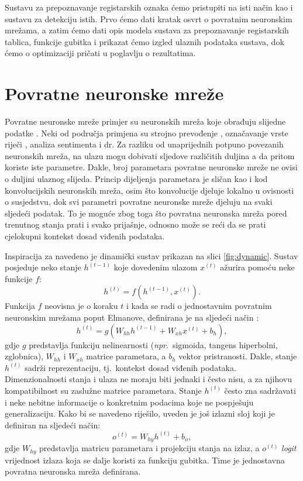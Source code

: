 \documentclass[times, utf8, diplomski]{fer}
\begin{document}
Sustavu za prepoznavanje registarskih oznaka ćemo pristupiti na isti način kao i sustavu za detekciju istih. Prvo ćemo dati kratak osvrt o povratnim neuronskim mrežama, a zatim ćemo dati opis modela sustava za prepoznavanje registarskih tablica, funkcije gubitka i prikazat ćemo izgled ulaznih podataka sustava, dok ćemo o optimizaciji pričati u poglavlju o rezultatima.

\section{Povratne neuronske mreže}
Povratne neuronske mreže primjer su neuronskih mreža koje obrađuju slijedne podatke . Neki od područja primjena su strojno prevođenje , označavanje vrste riječi , analiza sentimenta  i dr. Za razliku od unaprijednih potpuno povezanih neuronskih mreža, na ulazu mogu dobivati sljedove različitih duljina a da pritom koriste iste parametre. Dakle, broj parametara povratne neuronske mreže ne ovisi o duljini ulaznog slijeda. Princip dijeljenja parametara je sličan kao i kod konvolucijskih neuronskih mreža, osim što konvolucije djeluje lokalno u ovisnosti o susjedstvu, dok svi parametri povratne neuronske mreže djeluju na svaki sljedeći podatak. To je moguće zbog toga što povratna neuronska mreža pored trenutnog stanja prati i svako prijašnje, odnosno može se reći da se prati cjelokupni kontekst dosad viđenih podataka.

Inspiracija za navedeno je dinamički sustav prikazan na slici \ref{fig:dynamic}. Sustav posjeduje neko stanje $h^{(t-1)}$ koje dovedenim ulazom $x^{(t)}$ ažurira pomoću neke funkcije $f$:
\begin{equation}
    h^{(t)} = f(h^{(t-1)},x^{(t)}).
\end{equation}
Funkcija $f$ neovisna je o koraku $t$ i kada se radi o jednostavnim povratnim neuronskim mrežama poput Elmanove, definirana je na sljedeći način \citep{duboko}:
\begin{equation}
    h^{(t)} = g(W_{hh}h^{(t-1)} + W_{xh}x^{(t)} + b_h),
    \label{eq:hidden_state}
\end{equation}
gdje $g$ predstavlja funkciju nelinearnosti (\textit{npr}.\ sigmoida, tangens hiperbolni, zglobnica), $W_{hh}$ i $W_{xh}$ matrice parametara, a $b_h$ vektor pristranosti. Dakle, stanje $h^{(t)}$ sadrži reprezentaciju, tj.\ kontekst dosad viđenih podataka. Dimenzionalnosti stanja i ulaza ne moraju biti jednaki i često nisu, a za njihovu kompatibilnost su zaslužne matrice parametara. Stanje $h^{(t)}$ često zna sadržavati i neke nebitne informacije o konkretnim podacima koje ne pospješuju generalizaciju. Kako bi se navedeno riješilo, uveden je još izlazni sloj koji je definiran na sljedeći način:
\begin{equation}
    o^{(t)} = W_{hy}h^{(t)} + b_o,
    \label{eq:output_state}
\end{equation}
gdje $W_{hy}$ predstavlja matricu parametara i projekciju stanja na izlaz, a $o^{(t)}$ \textit{logit} vrijednost izlaza koja se dalje koristi za funkciju gubitka. Time je jednostavna povratna neuronska mreža definirana.
\end{document}
